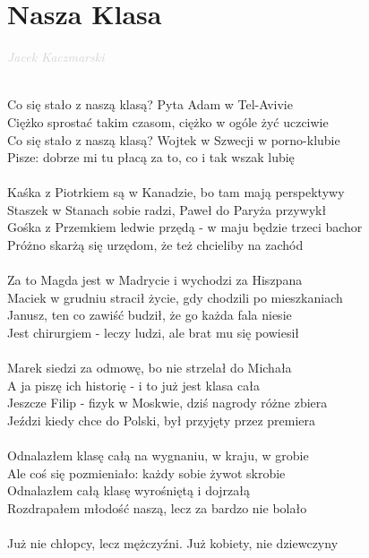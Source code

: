 \documentclass[a5paper, 10pt]{book}
\begin{document}
\newpage
\section{Nasza Klasa}\textcolor{lightgray}{\textit{Jacek Kaczmarski}}\\~\\
\begin{minipage}[t]{0.85\textwidth}
Co się stało z naszą klasą? Pyta Adam w Tel-Avivie\\
Ciężko sprostać takim czasom, ciężko w ogóle żyć uczciwie\\
Co się stało z naszą klasą? Wojtek w Szwecji w porno-klubie\\
Pisze: dobrze mi tu płacą za to, co i tak wszak lubię \\
\\
Kaśka z Piotrkiem są w Kanadzie, bo tam mają perspektywy\\
Staszek w Stanach sobie radzi, Paweł do Paryża przywykł\\
Gośka z Przemkiem ledwie przędą - w maju będzie trzeci bachor\\
Próżno skarżą się urzędom, że też chcieliby na zachód \\
\\
Za to Magda jest w Madrycie i wychodzi za Hiszpana\\
Maciek w grudniu stracił życie, gdy chodzili po mieszkaniach\\
Janusz, ten co zawiść budził, że go każda fala niesie\\
Jest chirurgiem - leczy ludzi, ale brat mu się powiesił \\
\\
Marek siedzi za odmowę, bo nie strzelał do Michała\\
A ja piszę ich historię - i to już jest klasa cała\\
Jeszcze Filip - fizyk w Moskwie, dziś nagrody różne zbiera\\
Jeździ kiedy chce do Polski, był przyjęty przez premiera \\
\\
Odnalazłem klasę całą na wygnaniu, w kraju, w grobie\\
Ale coś się pozmieniało: każdy sobie żywot skrobie\\
Odnalazłem całą klasę wyrośniętą i dojrzałą\\
Rozdrapałem młodość naszą, lecz za bardzo nie bolało \\
\\
Już nie chłopcy, lecz mężczyźni. Już kobiety, nie dziewczyny\\

\end{minipage}
\end{document}
